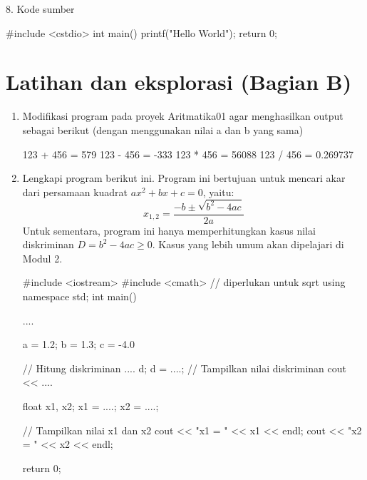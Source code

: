 \documentclass[a4paper,11pt]{extarticle}
\begin{document}
8. Kode sumber
\begin{cppcode}
#include <cstdio>
int main()
{
  printf("Hello World\n");
  return 0;
}
\end{cppcode}


\section{Latihan dan eksplorasi (Bagian B)}

\begin{enumerate}
\item Modifikasi program pada proyek \textsf{Aritmatika01} agar menghasilkan
   output sebagai berikut (dengan menggunakan nilai a dan b yang sama)
%
\begin{textcode}
123 + 456 = 579
123 - 456 = -333
123 * 456 = 56088
123 / 456 = 0.269737
\end{textcode}
%
\item Lengkapi program berikut ini. Program ini bertujuan untuk mencari akar
   dari persamaan kuadrat $ax^2 + bx + c = 0$, yaitu:
   \begin{equation}
   x_{1,2} = \frac{-b \pm \sqrt{b^2 - 4ac}}{2a}
   \end{equation}
  Untuk sementara, program ini hanya memperhitungkan kasus nilai diskriminan
  $D = b^2 - 4ac \geq 0$.
  Kasus yang lebih umum akan dipelajari di Modul 2.
%
\begin{cppcode}
#include <iostream>
#include <cmath>  // diperlukan untuk sqrt
using namespace std;
int main()
{
  ....
  
  a =  1.2;
  b =  1.3;
  c = -4.0
  
  // Hitung diskriminan
  .... d;
  d = ....;
  // Tampilkan nilai diskriminan
  cout << ....

  float x1, x2;
  x1 = ....;
  x2 = ....;

  // Tampilkan nilai x1 dan x2
  cout << "x1 = " << x1 << endl;
  cout << "x2 = " << x2 << endl;

  return 0;
}
\end{cppcode}
%
\end{enumerate}
\end{document}
